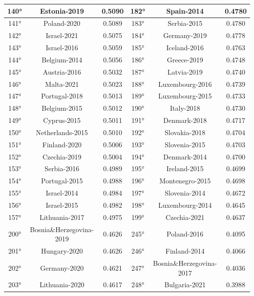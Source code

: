 \documentclass[a4paper,12pt, openright]{report}
\begin{document}
\begin{longtable}[c]{|c|c|c|c|c|c|}
    \hline
    140° &  Estonia-2019  & 0.5090 & 182° &  Spain-2014 & 0.4780 \\
    \hline
    141° &  Poland-2020 & 0.5089 & 183° &  Serbia-2015 & 0.4780 \\
    \hline
    142° &  Israel-2021 & 0.5075  & 184° &  Germany-2019 & 0.4778 \\
    \hline
    143° &  Israel-2016 & 0.5059 & 185° &  Iceland-2016 & 0.4763 \\
    \hline
    144° &  Belgium-2014 & 0.5056 & 186° &  Greece-2019 & 0.4748 \\
    \hline
    145° &  Austria-2016 & 0.5032 & 187° &  Latvia-2019 & 0.4740 \\ 
    \hline
    146° & Malta-2021 & 0.5023 & 188° &  Luxembourg-2016 & 0.4739 \\
    \hline
    147° &  Portugal-2018 & 0.5013 & 189° &  Luxembourg-2015 & 0.4733 \\
    \hline
    148° &  Belgium-2015 & 0.5012 & 190° &  Italy-2018 & 0.4730 \\
    \hline
    149° &  Cyprus-2015 & 0.5011 & 191° &  Denmark-2018 & 0.4717 \\
    \hline
    150° &  Netherlands-2015 & 0.5010 & 192° &  Slovakia-2018 & 0.4704 \\ 
    \hline
    151° &  Finland-2020 & 0.5006 & 193° &  Slovenia-2015 & 0.4703 \\ 
    \hline
    152° &  Czechia-2019 & 0.5004 & 194° &  Denmark-2014 & 0.4700 \\
    \hline
    153° &  Serbia-2016 & 0.4989 & 195° &  Ireland-2015 & 0.4699 \\
    \hline
    154° &  Portugal-2015 & 0.4988 & 196° &  Montenegro-2015 & 0.4698 \\ 
    \hline
    155° &  Israel-2014 & 0.4984 & 197° &  Slovenia-2014 & 0.4672 \\ 
    \hline
    156° &  Israel-2015 & 0.4982 & 198° &  Luxembourg-2014 & 0.4645 \\
    \hline
    157° & Lithuania-2017 & 0.4975 & 199° &  Czechia-2021 & 0.4637 \\
    \hline
    200° &  Bosnia\&Herzegovina-2019 & 0.4626 & 245° &  Poland-2016 &  0.4095\\
    \hline
    201° &  Hungary-2020 & 0.4626 & 246° &  Finland-2014 &  0.4066\\
    \hline
    202° &  Germany-2020 & 0.4621 &  247° &  Bosnia\&Herzegovina-2017 &  0.4036\\
    \hline
    203° &  Lithuania-2020 & 0.4617 & 248° &  Bulgaria-2021 &  0.3988 \\

\end{longtable}
\end{document}

